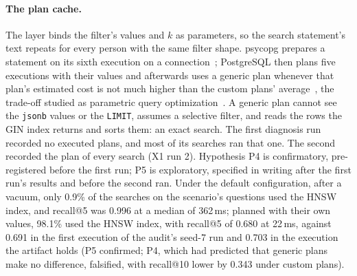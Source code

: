 \paragraph{The plan cache.}
The layer binds the filter's values and $k$ as parameters, so the search statement's text repeats
for every person with the same filter shape. psycopg prepares a statement on its sixth execution on
a connection~\cite{psycopg2026prepared}; PostgreSQL then plans five executions with their values and
afterwards uses a generic plan whenever that plan's estimated cost is not much higher than the
custom plans' average~\cite{postgresql2026prepare}, the trade-off studied as parametric query
optimization~\cite{ioannidis1997parametric}. A generic plan cannot see the \texttt{jsonb} values or
the \texttt{LIMIT}, assumes a selective filter, and reads the rows the GIN index returns and sorts
them: an exact search. The first diagnosis run recorded no executed plans, and most of its searches ran that one. The
second recorded the plan of every search (X1 run 2). Hypothesis P4 is confirmatory, pre-registered
before the first run; P5 is exploratory, specified in writing after the first run's results and
before the second ran.
Under the default configuration, after a vacuum, only 0.9\% of the searches on the scenario's questions used the HNSW
index, and recall@5 was 0.996 at a median of 362\,ms; planned with their own values, 98.1\% used
the HNSW index, with recall@5 of 0.680 at 22\,ms, against 0.691 in the first execution of the audit's seed-7 run and 0.703 in the execution the artifact holds (P5
confirmed; P4, which had predicted that generic plans make no difference, falsified,
with recall@10 lower by 0.343 under custom plans).

